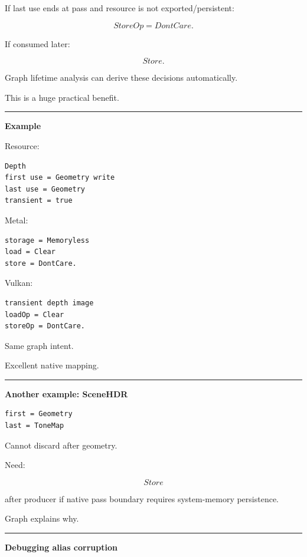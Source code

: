 If last use ends at pass and resource is not exported/persistent:

\[
StoreOp=
DontCare.
\]

If consumed later:

\[
Store.
\]

Graph lifetime analysis can derive these decisions automatically.

This is a huge practical benefit.

\begin{center}\rule{0.5\linewidth}{0.5pt}\end{center}

\textbf{Example}

Resource:

\begin{verbatim}
Depth
first use = Geometry write
last use = Geometry
transient = true
\end{verbatim}

Metal:

\begin{verbatim}
storage = Memoryless
load = Clear
store = DontCare.
\end{verbatim}

Vulkan:

\begin{verbatim}
transient depth image
loadOp = Clear
storeOp = DontCare.
\end{verbatim}

Same graph intent.

Excellent native mapping.

\begin{center}\rule{0.5\linewidth}{0.5pt}\end{center}

\textbf{Another example: SceneHDR}

\begin{verbatim}
first = Geometry
last = ToneMap
\end{verbatim}

Cannot discard after geometry.

Need:

\[
Store
\]

after producer if native pass boundary requires system-memory persistence.

Graph explains why.

\begin{center}\rule{0.5\linewidth}{0.5pt}\end{center}

\textbf{Debugging alias corruption}

